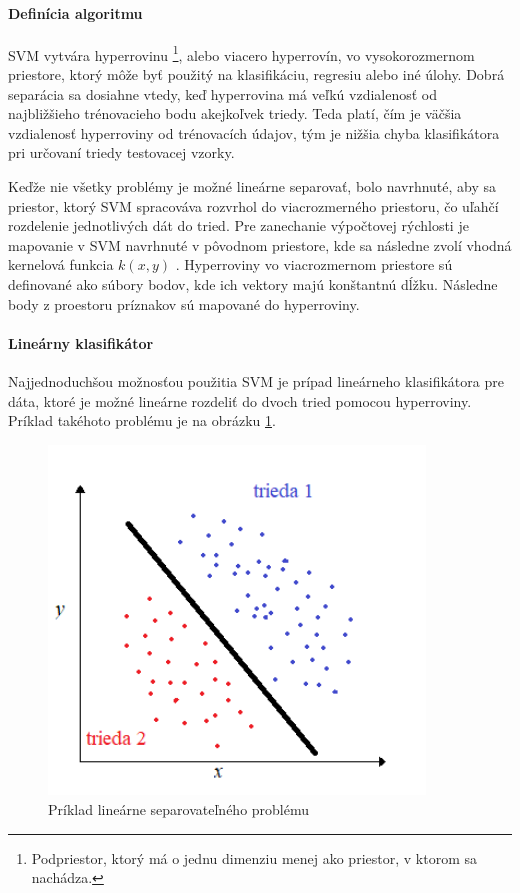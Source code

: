 \paragraph{Definícia algoritmu}
SVM vytvára hyperrovinu \footnote{Podpriestor, ktorý má o jednu dimenziu menej ako priestor, v ktorom sa nachádza.}, alebo viacero hyperrovín, vo vysokorozmernom priestore, ktorý môže byť použitý na klasifikáciu, regresiu alebo iné úlohy. Dobrá separácia sa dosiahne vtedy, keď hyperrovina má veľkú vzdialenosť od najbližšieho trénovacieho bodu akejkoľvek triedy. Teda platí, čím je väčšia vzdialenosť hyperroviny od trénovacích údajov, tým je nižšia chyba klasifikátora pri určovaní triedy testovacej vzorky.\cite{c12}

Keďže nie všetky problémy je možné lineárne separovať, bolo navrhnuté, aby sa priestor, ktorý SVM spracováva rozvrhol do viacrozmerného priestoru, čo uľahčí rozdelenie jednotlivých dát do tried. Pre zanechanie výpočtovej rýchlosti je mapovanie v SVM navrhnuté v pôvodnom priestore, kde sa následne zvolí vhodná kernelová funkcia $ k(x,y)$ . 
Hyperroviny vo viacrozmernom priestore sú definované ako súbory bodov, kde ich vektory majú konštantnú dĺžku. Následne body z proestoru príznakov sú mapované do hyperroviny. 

\paragraph{Lineárny klasifikátor}
Najjednoduchšou možnosťou použitia SVM je prípad lineárneho klasifikátora pre dáta, ktoré je možné lineárne rozdeliť do dvoch tried pomocou hyperroviny. Príklad takéhoto problému je na obrázku \ref{LinSep}.

\begin{figure}[!htbp]
  \centering
  \includegraphics[width=10cm]{img/linsep.png}
  \caption{Príklad lineárne separovateľného problému}
  \label{LinSep}
\end{figure}


